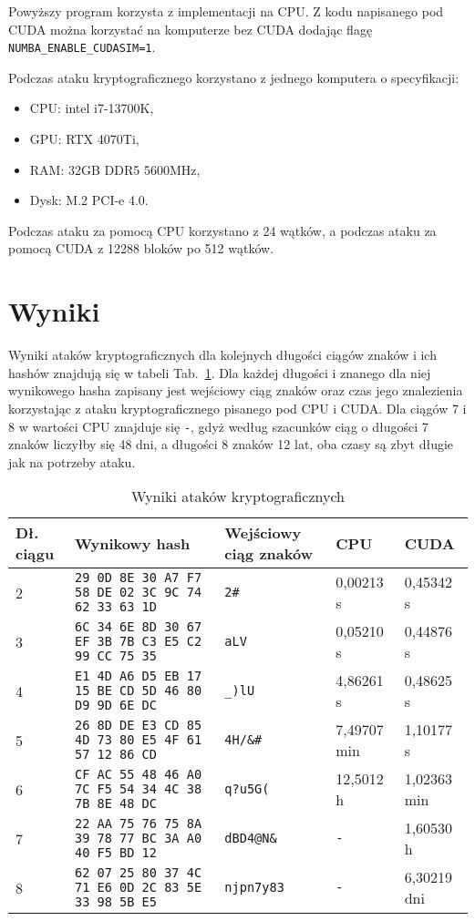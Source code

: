 \documentclass[polish,envcountsect,10pt]{article}
\begin{document}
Powyższy program korzysta z implementacji na CPU. Z kodu napisanego pod CUDA można korzystać na komputerze bez CUDA dodając flagę \texttt{NUMBA\_ENABLE\_CUDASIM=1}. 

Podczas ataku kryptograficznego korzystano z jednego komputera o specyfikacji:
\begin{itemize}
	\item CPU: intel i7-13700K,
	\item GPU: RTX 4070Ti,
	\item RAM: 32GB DDR5 5600MHz,
	\item Dysk: M.2 PCI-e 4.0.
\end{itemize}
Podczas ataku za pomocą CPU korzystano z 24 wątków, a podczas ataku za pomocą CUDA z 12288 bloków po 512 wątków.

\section{Wyniki}
Wyniki ataków kryptograficznych dla kolejnych długości ciągów znaków i ich hashów znajdują się w tabeli Tab.~\ref{tab:results}. 
Dla każdej długości i znanego dla niej wynikowego hasha zapisany jest wejściowy ciąg znaków oraz czas jego znalezienia korzystając z ataku kryptograficznego pisanego pod CPU i CUDA.
Dla ciągów 7 i 8 w wartości CPU znajduje się \texttt{-}, gdyż według szacunków ciąg o długości 7 znaków liczyłby się 48 dni, a długości 8 znaków 12 lat, oba czasy są zbyt długie jak na potrzeby ataku.
\begin{table}[H]
	\caption{Wyniki ataków kryptograficznych}
	\centering
	\label{tab:results}
	\begin{tabular}{|p{1.5cm}|p{4.5cm}|p{2cm}|p{2cm}|p{2cm}|}
		\hline
		Dł. ciągu	& Wynikowy hash												& Wejściowy ciąg znaków	& CPU			& CUDA			\\
		\hline
		2			& \texttt{29 0D 8E 30 A7 F7 58 DE 02 3C 9C 74 62 33 63 1D}	& \texttt{2\#} 			& 0,00213 s 	& 0,45342 s		\\
		\hline
		3			& \texttt{6C 34 6E 8D 30 67 EF 3B 7B C3 E5 C2 99 CC 75 35}	& \texttt{aLV} 			& 0,05210 s 	& 0,44876 s		\\
		\hline
		4			& \texttt{E1 4D A6 D5 EB 17 15 BE CD 5D 46 80 D9 9D 6E DC}	& \texttt{\_)lU} 		& 4,86261 s 	& 0,48625 s		\\
		\hline
		5			& \texttt{26 8D DE E3 CD 85 4D 73 80 E5 4F 61 57 12 86 CD}	& \texttt{4H/\&\#} 		& 7,49707 min 	& 1,10177 s		\\
		\hline
		6			& \texttt{CF AC 55 48 46 A0 7C F5 54 34 4C 38 7B 8E 48 DC}	& \texttt{q?u5G(} 		& 12,5012 h		& 1,02363 min	\\
		\hline
		7			& \texttt{22 AA 75 76 75 8A 39 78 77 BC 3A A0 40 F5 BD 12}	& \texttt{dBD4@N\&} 	& \texttt{-} 	& 1,60530 h		\\
		\hline
		8			& \texttt{62 07 25 80 37 4C 71 E6 0D 2C 83 5E 33 98 5B E5}	& \texttt{njpn7y83} 	& \texttt{-} 	& 6,30219 dni	\\
		\hline
	\end{tabular}
\end{table}
\end{document}
